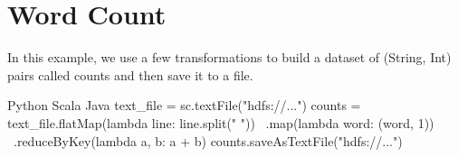 \section*{Word Count}
In this example, we use a few transformations to build a dataset of (String, Int) pairs called counts and then save it to a file.

Python
Scala
Java
text_file = sc.textFile("hdfs://...")
counts = text_file.flatMap(lambda line: line.split(" ")) \
             .map(lambda word: (word, 1)) \
             .reduceByKey(lambda a, b: a + b)
counts.saveAsTextFile("hdfs://...")
